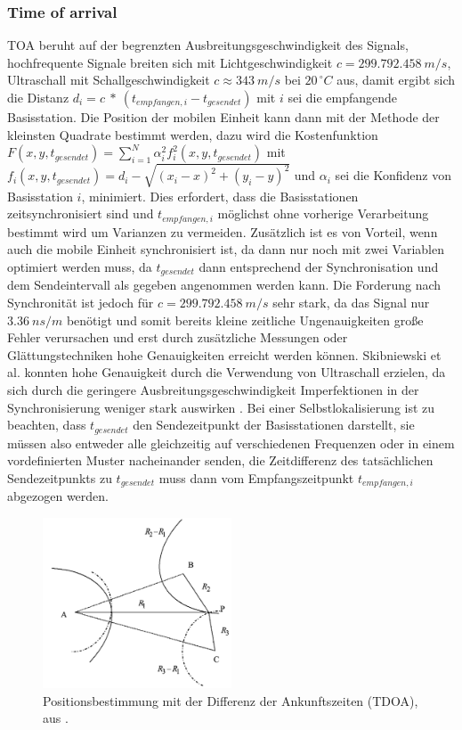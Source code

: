 \subsubsection{Time of arrival}
TOA beruht auf der begrenzten Ausbreitungsgeschwindigkeit des Signals, hochfrequente Signale breiten sich mit Lichtgeschwindigkeit $c = 299.792.458\ m/s$, Ultraschall mit Schallgeschwindigkeit $c \approx 343\ m/s$ bei $20^{\ \circ}C$ aus, damit ergibt sich die Distanz $d_i = c\ *\ (t_{empfangen,i} - t_{gesendet})$ mit $i$ sei die empfangende Basisstation. Die Position der mobilen Einheit kann dann mit der Methode der kleinsten Quadrate bestimmt werden, dazu wird die Kostenfunktion $F(x,y,t_{gesendet}) = \sum_{i=1}^{N} {\alpha}^2_i f^2_i(x,y,t_{gesendet})$ mit $f_i(x,y,t_{gesendet}) = d_i - \sqrt{(x_i - x)^2 + (y_i - y)^2}$ und ${\alpha}_i$ sei die Konfidenz von Basisstation $i$, minimiert. Dies erfordert, dass die Basisstationen zeitsynchronisiert sind und $t_{empfangen,i}$ möglichst ohne vorherige Verarbeitung bestimmt wird um Varianzen zu vermeiden. Zusätzlich ist es von Vorteil, wenn auch die mobile Einheit synchronisiert ist, da dann nur noch mit zwei Variablen optimiert werden muss, da $t_{gesendet}$ dann entsprechend der Synchronisation und dem Sendeintervall als gegeben angenommen werden kann. Die Forderung nach Synchronität ist jedoch für $c = 299.792.458\ m/s$ sehr stark, da das Signal nur $3.36\ ns/m$ benötigt und somit bereits kleine zeitliche Ungenauigkeiten große Fehler verursachen und erst durch zusätzliche Messungen oder Glättungstechniken hohe Genauigkeiten erreicht werden können. Skibniewski et al. konnten hohe Genauigkeit durch die Verwendung von Ultraschall erzielen, da sich durch die geringere Ausbreitungsgeschwindigkeit Imperfektionen in der Synchronisierung weniger stark auswirken \cite{skibniewski2009simulation}. 
Bei einer Selbstlokalisierung ist zu beachten, dass $t_{gesendet}$ den Sendezeitpunkt der Basisstationen darstellt, sie müssen also entweder alle gleichzeitig auf verschiedenen Frequenzen oder in einem vordefinierten Muster nacheinander senden, die Zeitdifferenz des tatsächlichen Sendezeitpunkts zu $t_{gesendet}$ muss dann vom Empfangszeitpunkt $t_{empfangen,i}$ abgezogen werden. \\

\begin{figure}[h]
  \centering
	\includegraphics[width=0.5\textwidth]{images/tdoa.png}
  \caption{Positionsbestimmung mit der Differenz der Ankunftszeiten (TDOA), aus \cite{liu2007survey}.}
  \label{fig:tdoa}
\end{figure}


